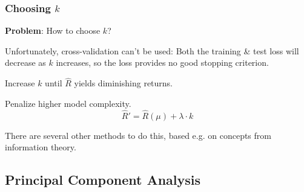 \subsubsection{Choosing $k$}

\textbf{Problem}: How to choose $k$?

{\footnotesize
    \remark Unfortunately, cross-validation can't be used: Both the training \& test loss will decrease as $k$ increases, so the loss provides no good stopping criterion.
}

\method Increase $k$ until $\hat{R}$ yields diminishing returns.\\

\method Penalize higher model complexity.\\
$$
    \hat{R}' = \hat{R}(\mu) + \lambda\cdot k
$$

There are several other methods to do this, based e.g. on concepts from information theory.

\subsection{Principal Component Analysis}